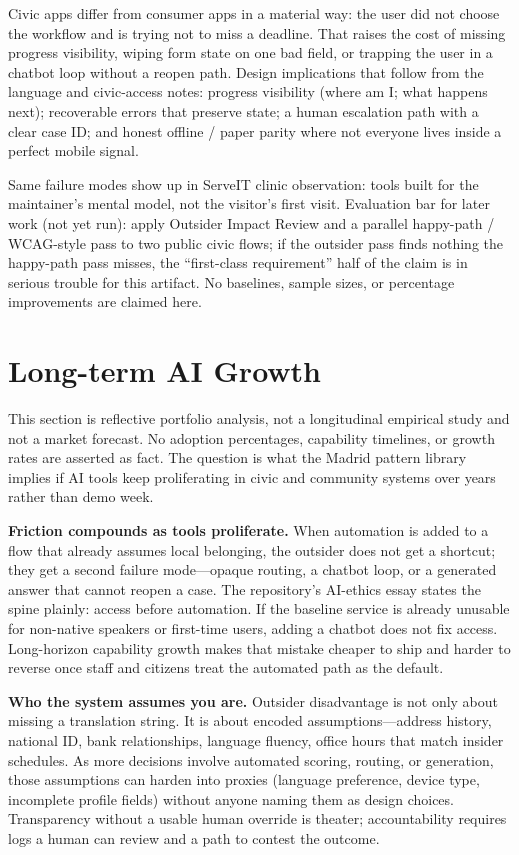 \documentclass[10pt,twocolumn]{article}
\begin{document}
Civic apps differ from consumer apps in a material way: the user did not choose
the workflow and is trying not to miss a deadline. That raises the cost of
missing progress visibility, wiping form state on one bad field, or trapping the
user in a chatbot loop without a reopen path. Design implications that follow
from the language and civic-access notes: progress visibility (where am I; what
happens next); recoverable errors that preserve state; a human escalation path
with a clear case ID; and honest offline / paper parity where not everyone lives
inside a perfect mobile signal.

Same failure modes show up in ServeIT clinic observation: tools built for the
maintainer's mental model, not the visitor's first visit. Evaluation bar for
later work (not yet run): apply Outsider Impact Review and a parallel
happy-path / WCAG-style pass to two public civic flows; if the outsider pass
finds nothing the happy-path pass misses, the ``first-class requirement'' half
of the claim is in serious trouble for this artifact. No baselines, sample
sizes, or percentage improvements are claimed here.

\section{Long-term AI Growth}
This section is reflective portfolio analysis, not a longitudinal empirical
study and not a market forecast. No adoption percentages, capability timelines,
or growth rates are asserted as fact. The question is what the Madrid pattern
library implies if AI tools keep proliferating in civic and community systems
over years rather than demo week.

\textbf{Friction compounds as tools proliferate.} When automation is added to a
flow that already assumes local belonging, the outsider does not get a shortcut;
they get a second failure mode---opaque routing, a chatbot loop, or a generated
answer that cannot reopen a case. The repository's AI-ethics essay states the
spine plainly: access before automation. If the baseline service is already
unusable for non-native speakers or first-time users, adding a chatbot does not
fix access. Long-horizon capability growth makes that mistake cheaper to ship
and harder to reverse once staff and citizens treat the automated path as the
default.

\textbf{Who the system assumes you are.} Outsider disadvantage is not only about
missing a translation string. It is about encoded assumptions---address history,
national ID, bank relationships, language fluency, office hours that match
insider schedules. As more decisions involve automated scoring, routing, or
generation, those assumptions can harden into proxies (language preference,
device type, incomplete profile fields) without anyone naming them as design
choices. Transparency without a usable human override is theater; accountability
requires logs a human can review and a path to contest the outcome.
\end{document}
